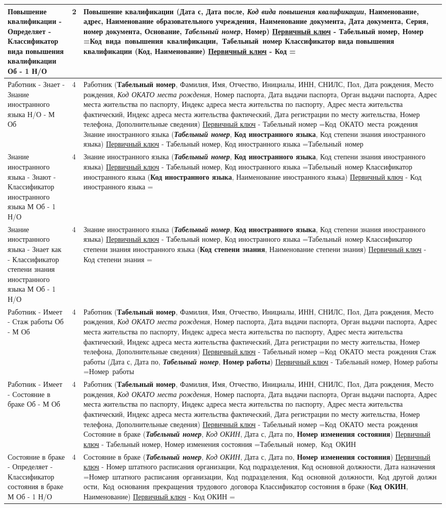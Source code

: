 \documentclass[10pt, a4paper, titlepage]{article}
\newcommand{\pk}[1]{\textbf{#1}}
\newcommand{\fk}[1]{\textit{#1}}
\newcommand{\pfk}[1]{\pk{\fk{#1}}}
\newcommand{\firstColumn}[4]{#1 - \newline #2 - \newline #3 \newline\newline #4}
\newcommand{\thirdColumn}[6]{
#1 \newline 
\underline{Первичный ключ} - #2 \newline 
\setbox0=\hbox{#3\unskip}\ifdim\wd0=0pt
\else
  \underline{Внешний(е) ключ(-и)}: #3 \newline
\fi
#4 \newline 
\underline{Первичный ключ} - #5 \newline
\setbox0=\hbox{#6\unskip}\ifdim\wd0=0pt
\else
  \underline{Внешний(е) ключ(-и)}: #6 \newline
\fi
}
\newcommand\ruleOneMondatoryOneOptionalNum{2}
\newcommand\ruleOneMondatoryOneOptional{1 Об - 1 Н/О}
\newcommand\ruleOneOptionalManyMondatoryNum{4}
\newcommand\ruleOneOptionalManyMondatory{1 Н/О - М Об}
\newcommand\ruleManyMondatoryOneOptionalNum{4}
\newcommand\ruleManyMondatoryOneOptional{М Об - 1 Н/О}
\newcommand\ruleOneMondatoryManyMondatoryNum{4}
\newcommand\ruleOneMondatoryManyMondatory{1 Об - М Об}
\newcommand\rabotnik{Работник (\pk{Табельный номер}, Фамилия, Имя, Отчество, Инициалы, ИНН, СНИЛС, Пол, Дата рождения, Место рождения, \fk{Код ОКАТО места рождения}, Номер паспорта, Дата выдачи паспорта, Орган выдачи паспорта, Адрес места жительства по паспорту, Индекс адреса места жительства по паспорту, Адрес места жительства фактический, Индекс адреса места жительства фактический, Дата регистрации по месту жительства, Номер телефона, Дополнительные сведения)}
\newcommand\rabotnikPK{Табельный номер}
\newcommand\rabotnikFK{Код ОКАТО места рождения}
\newcommand\kInostrannogoYazika{Классификатор иностранного языка (\pk{Код иностранного языка}, Наименование иностранного языка)}
\newcommand\kInostrannogoYazikaPK{Код иностранного языка}
\newcommand\kInostrannogoYazikaFK{}
\newcommand\kStepeniZnaniaInostrannogoYazika{Классификатор степени знания иностранного языка (\pk{Код степени знания}, Наименование степени знания)}
\newcommand\kStepeniZnaniaInostrannogoYazikaPK{Код степени знания}
\newcommand\kStepeniZnaniaInostrannogoYazikaFK{}
\newcommand\znanieInostrannogoYazika{Знание иностранного языка (\pfk{Табельный номер}, \pk{Код иностранного языка}, Код степени знания иностранного языка)}
\newcommand\znanieInostrannogoYazikaPK{Табельный номер, Код иностранного языка}
\newcommand\znanieInostrannogoYazikaFK{Табельный номер}
\newcommand\shtatnieEdinitsiPK{Номер штатного расписания организации, Код подразделения, Код основной должности, Дата назначения}
\newcommand\shtatnieEdinitsiFK{Номер штатного расписания организации, Код подразделения, Код основной должности, Код другой должности, Код основания прекращения трудового договора}
\newcommand\stazhRaboti{Стаж работы (Дата с, Дата по, \pfk{Табельный номер}, \pk{Номер работы})}
\newcommand\stazhRabotiPK{Табельный номер, Номер работы}
\newcommand\stazhRabotiFK{Номер работы}
\newcommand\kSostoyaniaVBrake{Классификатор состояния в браке (\pk{Код ОКИН}, Наименование)}
\newcommand\kSostoyaniaVBrakePK{Код ОКИН}
\newcommand\kSostoyaniaVBrakeFK{}
\newcommand\sostoyaniyeVBrake{Состояние в браке (\pfk{Табельный номер}, \fk{Код ОКИН}, Дата с, Дата по, \pk{Номер изменения состояния})}
\newcommand\sostoyaniyeVBrakePK{Табельный номер, Номер изменения состояния}
\newcommand\sostoyaniyeVBrakeFK{Табельный номер, Код ОКИН}
\newcommand\povishenieKvalifikatsii{Повышение квалификации (Дата с, Дата после, \fk{Код вида повышения квалификации}, Наименование, адрес, Наименование образовательного учреждения, Наименование документа, Дата документа, Серия, номер документа, Основание, \pfk{Табельный номер}, \pk{Номер})}
\newcommand\povishenieKvalifikatsiiPK{Табельный номер, Номер}
\newcommand\povishenieKvalifikatsiiFK{Код вида повышения квалификации, Табельный номер}
\newcommand\kVidaPovisheniyaKvalifikatsii{Классификатор вида повышения квалификации (\pk{Код}, Наименование)}
\newcommand\kVidaPovisheniyaKvalifikatsiiPK{Код}
\newcommand\kVidaPovisheniyaKvalifikatsiiFK{}
\begin{document}
\begin{center}
\begin{longtable}{ | m{3cm} | m{.1cm}| m{11cm} | }
 \hline
 \firstColumn{Повышение квалификации}{Определяет}{Классификатор вида повышения квалификации}{\ruleOneMondatoryOneOptional} & \ruleOneMondatoryOneOptionalNum & \thirdColumn{\povishenieKvalifikatsii}{\povishenieKvalifikatsiiPK}{\povishenieKvalifikatsiiFK}{\kVidaPovisheniyaKvalifikatsii}{\kVidaPovisheniyaKvalifikatsiiPK}{\kVidaPovisheniyaKvalifikatsiiFK} \\ 
 
 \hline
 \firstColumn{Работник}{Знает}{Знание иностранного языка}{\ruleOneOptionalManyMondatory} & \ruleOneOptionalManyMondatoryNum & \thirdColumn{\rabotnik}{\rabotnikPK}{\rabotnikFK}{\znanieInostrannogoYazika}{\znanieInostrannogoYazikaPK}{\znanieInostrannogoYazikaFK} \\ 
 
 \hline
 \firstColumn{Знание иностранного языка}{Знают}{Классификатор иностранного языка}{\ruleManyMondatoryOneOptional} & \ruleManyMondatoryOneOptionalNum & \thirdColumn{\znanieInostrannogoYazika}{\znanieInostrannogoYazikaPK}{\znanieInostrannogoYazikaFK}{\kInostrannogoYazika}{\kInostrannogoYazikaPK}{\kInostrannogoYazikaFK} \\ 
 
 \hline
 \firstColumn{Знание иностранного языка}{Знает как}{Классификатор степени знания иностранного языка}{\ruleManyMondatoryOneOptional} & \ruleManyMondatoryOneOptionalNum & \thirdColumn{\znanieInostrannogoYazika}{\znanieInostrannogoYazikaPK}{\znanieInostrannogoYazikaFK}{\kStepeniZnaniaInostrannogoYazika}{\kStepeniZnaniaInostrannogoYazikaPK}{\kStepeniZnaniaInostrannogoYazikaFK} \\ 
 
 \hline
 \firstColumn{Работник}{Имеет}{Стаж работы}{\ruleOneMondatoryManyMondatory} & \ruleOneMondatoryManyMondatoryNum & \thirdColumn{\rabotnik}{\rabotnikPK}{\rabotnikFK}{\stazhRaboti}{\stazhRabotiPK}{\stazhRabotiFK} \\ 
 
 \hline
 \firstColumn{Работник}{Имеет}{Состояние в браке}{\ruleOneMondatoryManyMondatory} & \ruleOneMondatoryManyMondatoryNum & \thirdColumn{\rabotnik}{\rabotnikPK}{\rabotnikFK}{\sostoyaniyeVBrake}{\sostoyaniyeVBrakePK}{\sostoyaniyeVBrakeFK} \\ 
 
 \hline
 \firstColumn{Состояние в браке}{Определяет}{Классификатор состояния в браке}{\ruleManyMondatoryOneOptional} & \ruleManyMondatoryOneOptionalNum & \thirdColumn{\sostoyaniyeVBrake}{\shtatnieEdinitsiPK}{\shtatnieEdinitsiFK}{\kSostoyaniaVBrake}{\kSostoyaniaVBrakePK}{\kSostoyaniaVBrakeFK} \\ 
 

\end{longtable}
\end{center}
\end{document}
